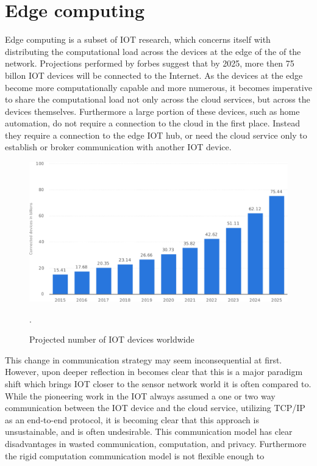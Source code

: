 \section{Edge computing}
Edge computing is a subset of IOT research, which concerns itself with distributing the computational load across the devices at the edge of the of the network. Projections performed by forbes suggest that by 2025, more then 75 billon IOT devices will be connected to the Internet. As the devices at the edge become more computationally capable and more numerous, it becomes imperative to share the computational load not only across the cloud services, but across the devices themselves. Furthermore a large portion of these devices, such as home automation, do not require a connection to the cloud in the first place. Instead they require a connection to the edge IOT hub, or need the cloud service only to establish or broker communication with another IOT device.
\begin{figure}[h]
	\centering
	\includegraphics[width=0.8\linewidth]{img/iot_statistics.pdf}	
	\caption{Projected number of IOT devices worldwide}.
	\label{lit:fig:1}
\end{figure}

This change in communication strategy may seem inconsequential at first. However, upon deeper reflection in becomes clear that this is a major paradigm shift which brings IOT closer to the sensor network world it is often compared to. While the pioneering work in the IOT always assumed a one or two way communication between the IOT device and the cloud service, utilizing TCP/IP as an end-to-end protocol, it is becoming clear that this approach is unsustainable, and is often undesirable. This communication model has clear disadvantages in wasted communication, computation, and privacy. Furthermore the rigid computation communication model is not flexible enough to 

